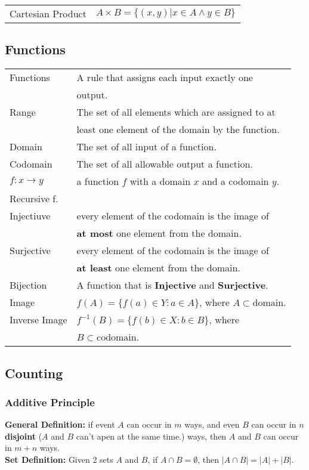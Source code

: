 \documentclass[5pt]{article}
\begin{document}
\begin{multicols}{2}
\begin{tabular}{ll}
    Cartesian Product & $A\times B=\{(x,y)|x\in A\land y \in B\}$
    
\end{tabular}

\subsection{Functions}

\begin{tabular}{ll}
    Functions           & A rule that assigns each input exactly one \\
                        & output.\\
    Range               & The set of all elements which are assigned to at\\
                        & least one element of the domain by the function.\\
    Domain              & The set of all input of a function.\\
    Codomain            & The set of all allowable output a function.\\
    $f:x\rightarrow y$   & a function $f$ with a domain $x$ and a codomain $y$.\\
    Recursive f.        & \\
    Injectiuve          & every element of the codomain is the image  of \\
                        & \textbf{at most} one element from the domain.\\
    Surjective          & every element of the codomain is the image  of \\
                        & \textbf{at least} one element from the domain.\\
    Bijection           & A function that is \textbf{Injective} and \textbf{Surjective}.\\
    Image               & $f(A)=\{f(a)\in Y: a\in A\}$, where $A\subset\text{domain}$.\\
    Inverse Image       & $f^{-1}(B)=\{f(b)\in X: b\in B\}$, where \\
                        & $B\subset\text{codomain}$.\\
\end{tabular}

\subsection{Counting}
\subsubsection{Additive Principle}
\textbf{General Definition:} 
if event $A$ can occur in $m$ ways, and even $B$ can occur in $n$ \textbf{disjoint} ($A$ and $B$ can't apen at the same time.) ways, then $A$ and $B$ can occur in $m+n$ ways.\\   
\textbf{Set Definition:} Given 2 sets $A$ and $B$, if $A\cap B =\emptyset$, then $|A\cap B| = |A| + |B|$.



\end{multicols}
\end{document}
